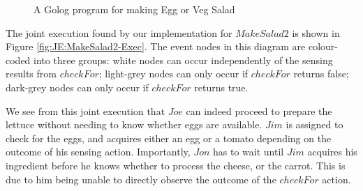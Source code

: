 %
\begin{figure}
\begin{centering}
\par\end{centering}

\caption{A Golog program for making Egg or Veg Salad\label{fig:MIndiGolog:MakeSalad2}}

\end{figure}


The joint execution found by our implementation for $MakeSalad2$
is shown in Figure \ref{fig:JE:MakeSalad2-Exec}. The event nodes
in this diagram are colour-coded into three groups: white nodes can
occur independently of the sensing results from $checkFor$; light-grey
nodes can only occur if $checkFor$ returns false; dark-grey nodes
can only occur if $checkFor$ returns true.

We see from this joint execution that $Joe$ can indeed proceed to
prepare the lettuce without needing to know whether eggs are available.
$Jim$ is assigned to check for the eggs, and acquires either an egg
or a tomato depending on the outcome of his sensing action. Importantly,
$Jon$ has to wait until $Jim$ acquires his ingredient before he
knows whether to process the cheese, or the carrot. This is due to
him being unable to directly observe the outcome of the $checkFor$
action.

